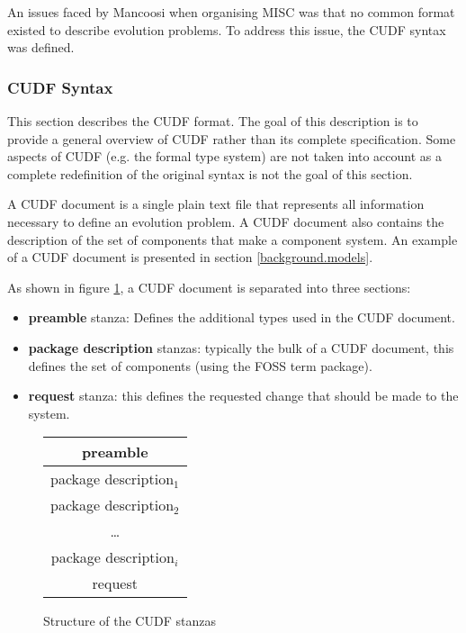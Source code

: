 An issues faced by Mancoosi when organising MISC was that no common format existed to describe evolution problems.
To address this issue, the CUDF syntax \citep{treinen2009common} was defined.

\subsubsection{CUDF Syntax}
This section describes the CUDF format.
The goal of this description is to provide a general overview of CUDF rather than its complete specification.
Some aspects of CUDF (e.g. the formal type system) are not taken into account  as a complete redefinition of the original syntax is not the goal of this section.

A CUDF document is a single plain text file that represents all information necessary to define an evolution problem.
A CUDF document also contains the description of the set of components that make a component system.
An example of a CUDF document is presented in section \ref{background.models}.

As shown in figure \ref{formal:cudfstruct}, a CUDF document is separated into three sections:
\begin{itemize}
  \item \textbf{preamble} stanza: Defines the additional types used in the CUDF document.
  \item \textbf{package description} stanzas: typically the bulk of a CUDF document, this defines the set of components (using the FOSS term package).
  \item \textbf{request} stanza: this defines the requested change that should be made to the system.
\end{itemize}

\begin{figure}[htp]
\centering
\begin{tabular}{|c|}
\hline preamble \\ \hline
\hline package description$_{1}$ \\ \hline
\hline package description$_{2}$ \\ \hline
 \multicolumn{1}{c}{\ldots}  \\ 
\hline package description$_{i}$\\ \hline
\hline request\\ \hline
\end{tabular}
\caption{Structure of the CUDF stanzas}
\label{formal:cudfstruct}
\end{figure}


